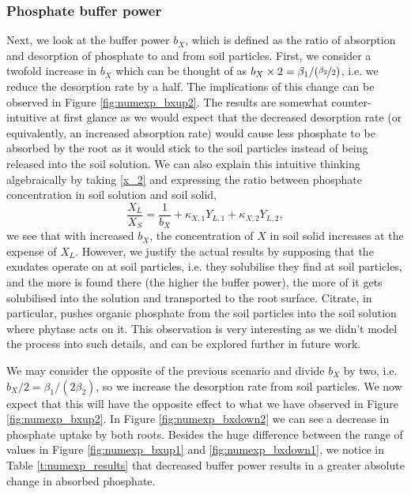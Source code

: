\documentclass[11pt]{article}
\numberwithin{equation}{section}
\begin{document}
\subsubsection{Phosphate buffer power}
\label{sec:numexp_bx}
Next, we look at the buffer power $b_X$, which is defined as the ratio of absorption and desorption of phosphate to and from soil particles. First, we consider a twofold increase in $b_X$ which can be thought of as $b_X \times 2 = \beta_1 / (  \nicefrac{\beta_2}{2} )$, i.e. we reduce the desorption rate by a half. The implications of this change can be observed in Figure \ref{fig:numexp_bxup2}. The results are somewhat counter-intuitive at first glance as we would expect that the decreased desorption rate (or equivalently, an increased absorption rate) would cause less phosphate to be absorbed by the root as it would stick to the soil particles instead of being released into the soil solution. We can also explain this intuitive thinking algebraically by taking \eqref{x_2} and expressing the ratio between phosphate concentration in soil solution and soil solid,
\begin{equation}
    \frac{X_L}{X_S} = \frac{1}{b_X} + \kappa_{X,1} Y_{L,1} + \kappa_{X,2} Y_{L,2},
\end{equation}
we see that with increased $b_X$, the concentration of $X$ in soil solid increases at the expense of $X_L$. However, we justify the actual results by supposing that the exudates operate on  at soil particles, i.e. they solubilise  they find at soil particles, and the more  is found there (the higher the buffer power), the more of it gets solubilised into the solution and transported to the root surface. Citrate, in particular, pushes organic phosphate from the soil particles into the soil solution where phytase acts on it. This observation is very interesting as we didn't model the process into such details, and can be explored further in future work.

We may consider the opposite of the previous scenario and divide $b_X$ by two, i.e. $b_X / 2 = \beta_1 / (2 \beta_2)$, so we increase the desorption rate from soil particles. We now expect that this will have the opposite effect to what we have observed in Figure \ref{fig:numexp_bxup2}. In Figure \ref{fig:numexp_bxdown2} we can see a decrease in phosphate uptake by both roots. Besides the huge difference between the range of values in Figure \ref{fig:numexp_bxup1} and \ref{fig:numexp_bxdown1}, we notice in Table \ref{t:numexp_results} that decreased buffer power results in a greater absolute change in absorbed phosphate.
\end{document}
